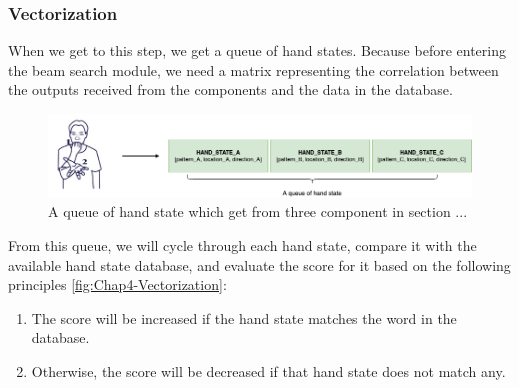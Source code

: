 \subsubsection{ Vectorization }

When we get to this step, we get a queue of hand states. Because before entering the beam search module, we need a matrix representing the correlation between the outputs received from the components and the data in the database.

\begin{figure}[H]
  \centering
  \includegraphics[width=\textwidth]{img/Chap4/HandStateQueue.png}
  \caption{A queue of hand state which get from three component in section ... }
  \label{fig:Chap4-HandStateQueue}
\end{figure}

From this queue, we will cycle through each hand state, compare it with the available hand state database, and evaluate the score for it based on the following principles \ref{fig:Chap4-Vectorization}:

\begin{enumerate}
  \item The score will be increased if the hand state matches the word in the database.
  \item Otherwise, the score will be decreased if that hand state does not match any.
\end{enumerate}

